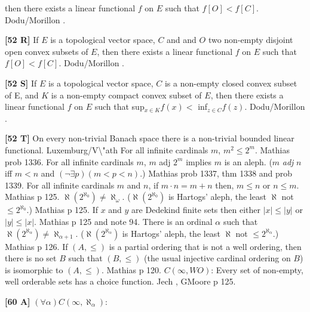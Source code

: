 then there exists a linear functional $f$ on $E$ such that $f[O] <
f[C]$. \ac{Dodu/Morillon} \cite{1999}.
\smallskip
\item{}{\bf [52 R]} If $E$ is a topological vector space, $C$ and
and $O$ two non-empty disjoint open convex subsets of $E$, then there
exists a linear functional $f$ on $E$ such that $f[O] < f[C]$.
\ac{Dodu/Morillon} \cite{1999}.
\smallskip
\item{}{\bf [52 S]} If $E$ is a topological vector space, $C$ is a
non-empty closed convex subset of E, and $K$ is a non-empty compact
convex subset of $E$, then there exists a linear functional $f$ on $E$
such that  sup$_{x\in K}f(x) <$ inf$_{z\in C}f(z)$. \ac{Dodu/Morillon}
\cite{1999}.
\smallskip
\item{}{\bf [52 T]}  On every non-trivial Banach space there
is a non-trivial bounded linear functional.  \ac{Luxemburg/V\"ath}
\cite{2001}  
\medskip
{} For all infinite cardinals $m$, $m^2\le
2^m$.  \ac{Mathias} \cite{1979} prob 1336.
\medskip
{} For all infinite cardinals $m$, $m$ adj $2^{m}$
implies $m$ is an aleph.  ($m$ {\it adj} $n$ iff $m < n$ and $(\neg
\exists p) (m<p<n)$.)  \ac{Mathias} \cite{1979} prob 1337, thm 1338 and
prob 1339.
\medskip
{}  For all infinite cardinals $m$ and $n$, if
$m\cdot n = m + n$ then, $m \le  n$ or $n \le m$. \ac{Mathias} \cite{1979}
p 125.
\medskip
{} $\aleph(2^{\aleph_{0}})\neq\aleph_{\omega}$.
($\aleph(2^{\aleph_{0}})$ is Hartogs' aleph, the least $\aleph$
not $\le 2^{\aleph_{0}}$.)  \ac{Mathias} \cite{1979} p 125.
\medskip
{} If $x$ and $y$ are Dedekind finite sets then either
$|x|\le |y|$ or $|y|\le |x|$.  \ac{Mathias} \cite{1979} p 125 and note 94.
\medskip
{}  There is an ordinal $\alpha$ such that
$\aleph(2^{\aleph_{\alpha }})\neq\aleph_{\alpha +1}$.
($\aleph(2^{\aleph_{\alpha}})$ is Hartogs' aleph, the least $\aleph$
not $\le 2^{\aleph _{\alpha}}$.) \ac{Mathias} \cite{1979} p 126.
\medskip
{} If $(A,\le)$ is a partial ordering that
is not a well ordering, then there is no set $B$ such that $(B,\le)$
(the usual injective cardinal ordering on $B$) is isomorphic to
$(A,\le)$.  \ac{Mathias} \cite{1979} p 120.
\medskip
{} $C(\infty,WO)$: Every set of non-empty, well
orderable sets has a choice function. \ac{Jech} \cite{1973b}, G\.
\ac{Moore} \cite{1982} p 125.
\smallskip
\item{}{\bf [60 A]}  $(\forall\alpha) C(\infty,\aleph_{\alpha})$:

